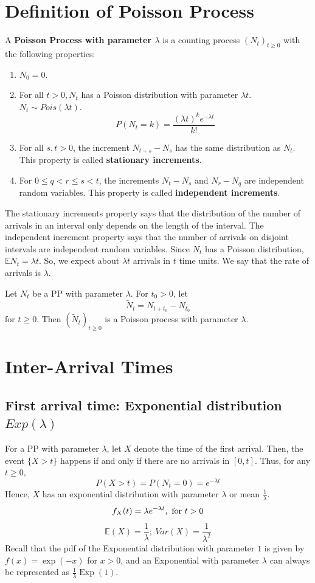 \documentclass[11pt]{elegantbook}
\begin{document}
\section{Definition of Poisson Process}
\begin{definition}[Definition 1 of PP]
        A \textbf{Poisson Process with parameter $\lambda$} is a counting process $\left(N_t\right)_{t \geq 0}$ with the following properties:
        \begin{enumerate}
            \item $N_0=0$.
            \item For all $t>0, N_t$ has a Poisson distribution with parameter $\lambda t$. $N_t\sim Pois(\lambda t)$.
            $$P(N_t=k)=\frac{(\lambda t)^{k}e^{-\lambda t}}{k!}$$
            \item For all $s, t>0$, the increment $N_{t+s}-N_s$ has the same distribution as $N_t$. This property is called \textbf{stationary increments}.
            \item For $0 \leq q<r \leq s<t$, the increments $N_t-N_s$ and $N_r-N_q$ are independent random variables. This property is called \textbf{independent increments}.
        \end{enumerate}
\end{definition}
The stationary increments property says that the distribution of the number of arrivals in an interval only depends on the length of the interval. The independent increment property says that the number of arrivals on disjoint intervals are independent random variables. Since $N_t$ has a Poisson distribution, $\mathbb{E} N_t=\lambda t$. So, we expect about $\lambda t$ arrivals in $t$ time units. We say that the rate of arrivals is $\lambda$.
\begin{proposition}[Translated PP]
    Let $N_t$ be a PP with parameter $\lambda$. For $t_0 > 0$, let $$\tilde{N}_t=N_{t+t_0}-N_{t_0}$$ for $t\geq 0$. Then $(\tilde{N}_t)_{t\geq 0}$ is a Poisson process with parameter $\lambda$.
\end{proposition}

\section{Inter-Arrival Times}
\subsection{First arrival time: Exponential distribution $Exp(\lambda)$}
For a PP with parameter $\lambda$, let $X$ denote the time of the first arrival. Then, the event $\{X>t\}$ happens if and only if there are no arrivals in $[0, t]$. Thus, for any $t \geq 0$,
$$
P(X>t)=P\left(N_t=0\right)=e^{-\lambda t}
$$
Hence, $X$ has an exponential distribution with parameter $\lambda$ or mean $\frac{1}{\lambda}$.
$$f_{X}(t)=\lambda e^{-\lambda t},\ \textnormal{for } t>0$$
$$\mathbb{E}(X)=\frac{1}{\lambda};\ Var(X)=\frac{1}{\lambda^2}$$
Recall that the pdf of the Exponential distribution with parameter $1$ is given by $f(x)=\exp (-x)$ for $x>0$, and an Exponential with parameter $\lambda$ can always be represented as $\frac{1}{\lambda} \operatorname{Exp}(1)$.
\end{document}

